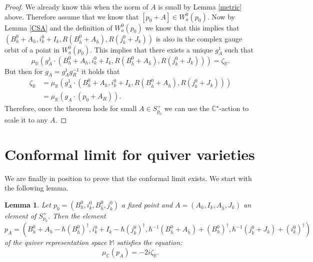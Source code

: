 \documentclass[12pt,oneside,reqno]{amsart}
\newtheorem{lemma}[theorem]{Lemma}
\theoremstyle{definition}
\numberwithin{equation}{section}
\numberwithin{theorem}{section}
\newcommand{\R}{\mathbb{R}}
\newcommand{\C}{\mathbb{C}}
\renewcommand{\d}[1]{\ensuremath{\operatorname{d}\!{#1}}}
\renewcommand{\d}{\dagger}
\begin{document}
%
\begin{proof}
We already know this when the norm of $A$ is small by Lemma \ref{metric} above. Therefore assume that we know that $[p_0+A]\in W_a^0(p_0)$. Now by Lemma \ref{CSA} and the definition of $W_a^0(p_0)$ we know that this implies that $(B_h^0+A_h,i_k^0+I_k,R(B_{\bar h}^0+A_{\bar h}), R(j_k^0+J_k))$ is also in the complex gauge orbit of a point in $W_a^0(p_0)$. This implies that there exists a unique $g^1_A$ such that 
%
\begin{equation*}
\mu_{\R}(g^1_A\cdot(B_h^0+A_h,i_k^0+I_k,R(B_{\bar h}^0+A_{\bar h}), R(j_k^0+J_k))) = \zeta_{\R}.
\end{equation*}
%
But then for $g_A = g^1_Ag^{-1}_R$ it holds that 
%
\begin{equation*}
\begin{split}
\zeta_{\R} &= \mu_{\R}(g^1_A\cdot(B_h^0+A_h,i_k^0+I_k,R(B_{\bar h}^0+A_{\bar h}), R(j_k^0+J_k))) \\
&= \mu_{\R}(g_A\cdot(p_0+A_R)).
\end{split}
\end{equation*}
%
Therefore, once the theorem hods for small $A\in S^+_{p_0}$ we can use the $\C^{\star}$-action to scale it to any $A$. 
\end{proof}
%





\section{Conformal limit for quiver varieties}

We are finally in position to prove that the conformal limit exists. We start with the following lemma. 
%
\begin{lemma}\label{PA}
    Let $p_0=(B_h^0,i_k^0,B_{\bar{h}}^0,j_k^0)$ a fixed point and $A=(A_h,I_k,A_{\bar{h}},J_k)$ an element of $S_{p_0} ^+$. Then the element $p_A=(B_h^0+A_h-\hbar(B_{\bar{h}}^0)^\d,i_k^0+I_k-{\hbar}(j_k^0)^\d,{\hbar}^{-1}(B_{\bar{h}}^0+A_{\bar{h}})+(B_h^0)^\d,\hbar^{-1}(j_k^0+J_k)+(i_k^0)^\d)$ of the quiver representation space $\mathbb{M}$ satisfies the equation:
    \begin{equation}
        \mu_\C(p_A)=-2i\zeta_\R.
    \end{equation}
\end{lemma}
%
\end{document}
